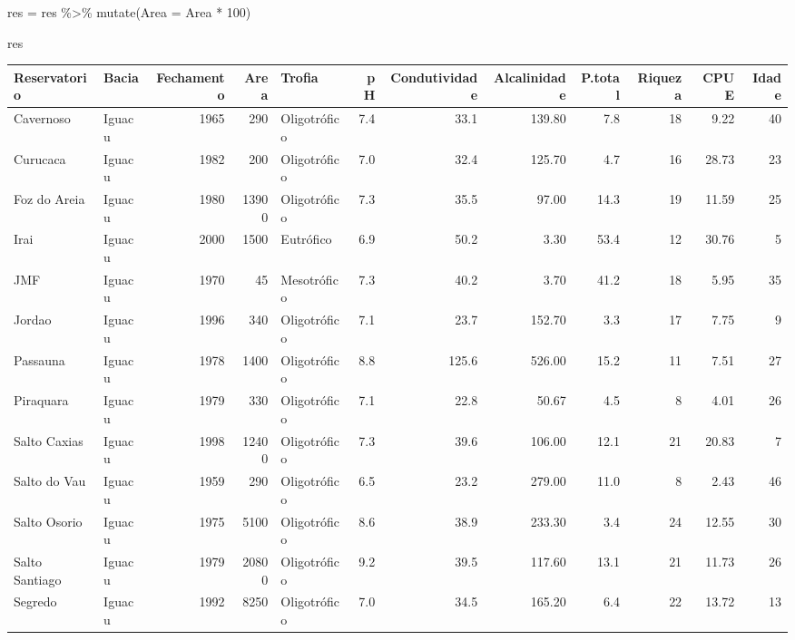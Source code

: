 \documentclass[
]{book}
\newenvironment{Shaded}{\begin{snugshade}}{\end{snugshade}}
\newcommand{\AttributeTok}[1]{\textcolor[rgb]{0.77,0.63,0.00}{#1}}
\newcommand{\DecValTok}[1]{\textcolor[rgb]{0.00,0.00,0.81}{#1}}
\newcommand{\FunctionTok}[1]{\textcolor[rgb]{0.00,0.00,0.00}{#1}}
\newcommand{\NormalTok}[1]{#1}
\newcommand{\OtherTok}[1]{\textcolor[rgb]{0.56,0.35,0.01}{#1}}
\newcommand{\SpecialCharTok}[1]{\textcolor[rgb]{0.00,0.00,0.00}{#1}}
\begin{document}
\begin{Shaded}
\begin{Highlighting}[]
\NormalTok{res }\OtherTok{=}\NormalTok{ res }\SpecialCharTok{\%\textgreater{}\%} 
  \FunctionTok{mutate}\NormalTok{(}\AttributeTok{Area =}\NormalTok{ Area }\SpecialCharTok{*} \DecValTok{100}\NormalTok{)}

\NormalTok{res}
\end{Highlighting}
\end{Shaded}

\begin{table}
\centering\begingroup\fontsize{8}{10}\selectfont

\begin{tabular}{llrrlrrrrrrr}
\toprule
Reservatorio & Bacia & Fechamento & Area & Trofia & pH & Condutividade & Alcalinidade & P.total & Riqueza & CPUE & Idade\\
\midrule
Cavernoso & Iguacu & 1965 & 290 & Oligotrófico & 7.4 & 33.1 & 139.80 & 7.8 & 18 & 9.22 & 40\\
Curucaca & Iguacu & 1982 & 200 & Oligotrófico & 7.0 & 32.4 & 125.70 & 4.7 & 16 & 28.73 & 23\\
Foz do Areia & Iguacu & 1980 & 13900 & Oligotrófico & 7.3 & 35.5 & 97.00 & 14.3 & 19 & 11.59 & 25\\
Irai & Iguacu & 2000 & 1500 & Eutrófico & 6.9 & 50.2 & 3.30 & 53.4 & 12 & 30.76 & 5\\
JMF & Iguacu & 1970 & 45 & Mesotrófico & 7.3 & 40.2 & 3.70 & 41.2 & 18 & 5.95 & 35\\
\addlinespace
Jordao & Iguacu & 1996 & 340 & Oligotrófico & 7.1 & 23.7 & 152.70 & 3.3 & 17 & 7.75 & 9\\
Passauna & Iguacu & 1978 & 1400 & Oligotrófico & 8.8 & 125.6 & 526.00 & 15.2 & 11 & 7.51 & 27\\
Piraquara & Iguacu & 1979 & 330 & Oligotrófico & 7.1 & 22.8 & 50.67 & 4.5 & 8 & 4.01 & 26\\
Salto Caxias & Iguacu & 1998 & 12400 & Oligotrófico & 7.3 & 39.6 & 106.00 & 12.1 & 21 & 20.83 & 7\\
Salto do Vau & Iguacu & 1959 & 290 & Oligotrófico & 6.5 & 23.2 & 279.00 & 11.0 & 8 & 2.43 & 46\\
\addlinespace
Salto Osorio & Iguacu & 1975 & 5100 & Oligotrófico & 8.6 & 38.9 & 233.30 & 3.4 & 24 & 12.55 & 30\\
Salto Santiago & Iguacu & 1979 & 20800 & Oligotrófico & 9.2 & 39.5 & 117.60 & 13.1 & 21 & 11.73 & 26\\
Segredo & Iguacu & 1992 & 8250 & Oligotrófico & 7.0 & 34.5 & 165.20 & 6.4 & 22 & 13.72 & 13\\

\end{tabular}
\end{table}
\end{document}
